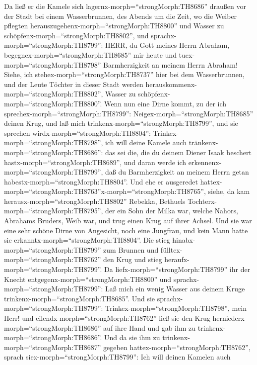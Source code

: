  Da ließ er die Kamele sich
lagernx-morph=``strongMorph:TH8686'' draußen vor der Stadt bei einem
Wasserbrunnen, des Abends um die Zeit, wo die Weiber pflegten
herauszugehenx-morph=``strongMorph:TH8800'' und Wasser zu
schöpfenx-morph=``strongMorph:TH8802'',  und
sprachx-morph=``strongMorph:TH8799'': HERR, du Gott meines Herrn
Abraham, begegnex-morph=``strongMorph:TH8685'' mir heute und
tuex-morph=``strongMorph:TH8798'' Barmherzigkeit an meinem Herrn
Abraham!  Siehe, ich stehex-morph=``strongMorph:TH8737''
hier bei dem Wasserbrunnen, und der Leute Töchter in dieser Stadt werden
herauskommenx-morph=``strongMorph:TH8802'', Wasser zu
schöpfenx-morph=``strongMorph:TH8800''.  Wenn nun eine
Dirne kommt, zu der ich sprechex-morph=``strongMorph:TH8799'':
Neigex-morph=``strongMorph:TH8685'' deinen Krug, und laß mich
trinkenx-morph=``strongMorph:TH8799'', und sie sprechen
wirdx-morph=``strongMorph:TH8804'':
Trinkex-morph=``strongMorph:TH8798'', ich will deine Kamele auch
tränkenx-morph=``strongMorph:TH8686'': das sei die, die du deinem Diener
Isaak beschert hastx-morph=``strongMorph:TH8689'', und daran werde ich
erkennenx-morph=``strongMorph:TH8799'', daß du Barmherzigkeit an meinem
Herrn getan habestx-morph=``strongMorph:TH8804''.  Und ehe
er ausgeredet
hattex-morph=``strongMorph:TH8763''x-morph=``strongMorph:TH8765'',
siehe, da kam herausx-morph=``strongMorph:TH8802'' Rebekka, Bethuels
Tochterx-morph=``strongMorph:TH8795'', der ein Sohn der Milka war,
welche Nahors, Abrahams Bruders, Weib war, und trug einen Krug auf ihrer
Achsel.  Und sie war eine sehr schöne Dirne von Angesicht,
noch eine Jungfrau, und kein Mann hatte sie
erkanntx-morph=``strongMorph:TH8804''. Die stieg
hinabx-morph=``strongMorph:TH8799'' zum Brunnen und
fülltex-morph=``strongMorph:TH8762'' den Krug und stieg
heraufx-morph=``strongMorph:TH8799''.  Da
liefx-morph=``strongMorph:TH8799'' ihr der Knecht
entgegenx-morph=``strongMorph:TH8800'' und
sprachx-morph=``strongMorph:TH8799'': Laß mich ein wenig Wasser aus
deinem Kruge trinkenx-morph=``strongMorph:TH8685''.  Und
sie sprachx-morph=``strongMorph:TH8799'':
Trinkex-morph=``strongMorph:TH8798'', mein Herr! und
eilendx-morph=``strongMorph:TH8762'' ließ sie den Krug
herniederx-morph=``strongMorph:TH8686'' auf ihre Hand und gab ihm zu
trinkenx-morph=``strongMorph:TH8686''.  Und da sie ihm zu
trinkenx-morph=``strongMorph:TH8687'' gegeben
hattex-morph=``strongMorph:TH8762'', sprach
siex-morph=``strongMorph:TH8799'': Ich will deinen Kamelen auch
